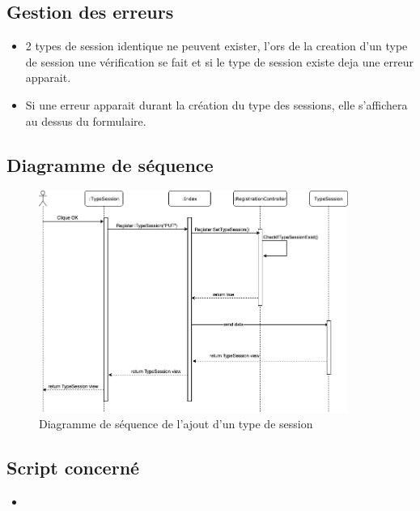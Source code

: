 \subsection{Gestion des erreurs}
	\begin{itemize}
		\item 2 types de session identique ne peuvent exister, l'ors de la creation d'un type de session une vérification se fait et si le type de session existe deja une erreur apparait.
		\item Si une erreur apparait durant la création du type des sessions, elle s'affichera au dessus du formulaire. 
	\end{itemize}
	
\newpage
\subsection{Diagramme de séquence}
	\begin{figure}[h]
		\includegraphics[width=0.9\textwidth,center]{Diagramme/sequence-us11}
		\caption{Diagramme de séquence de l'ajout d'un type de session}
	\end{figure}

\subsection{Script concerné}
	\begin{itemize}
		\item \href{}{}
	\end{itemize}
